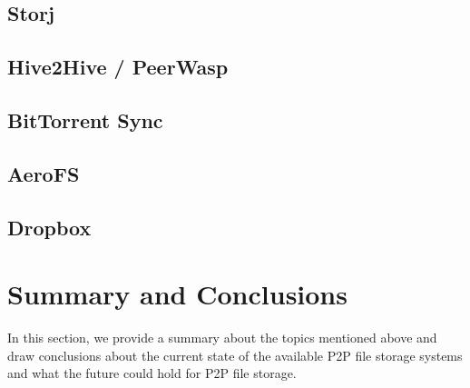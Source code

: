 \subsection{Storj}

\subsection{Hive2Hive / PeerWasp}

\subsection{BitTorrent Sync}

\subsection{AeroFS}

\subsection{Dropbox}

\section{Summary and Conclusions} In this section, we provide a summary about
the topics mentioned above and draw conclusions about the current state of the
available P2P file storage systems and what the future could hold for P2P file
storage.

